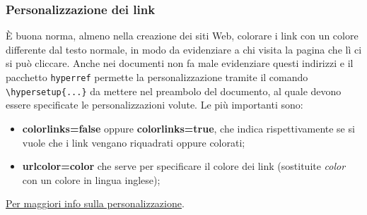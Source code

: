 \subsubsection{Personalizzazione dei link}
È buona norma, almeno nella creazione dei siti Web, colorare i link con un colore differente dal testo normale, in modo da evidenziare a chi visita la pagina che lì ci si può cliccare. Anche nei documenti non fa male evidenziare questi indirizzi e il pacchetto \verb!hyperref! permette la personalizzazione tramite il comando \verb!\hypersetup{...}! da mettere nel preambolo del documento, al quale devono essere specificate le personalizzazioni volute. Le più importanti sono:
\begin{itemize}
    \item \textbf{colorlinks=false} oppure \textbf{colorlinks=true}, che indica rispettivamente se si vuole che i link vengano riquadrati oppure colorati;
    \item \textbf{urlcolor=color} che serve per specificare il colore dei link (sostituite \textit{color} con un colore in lingua inglese);
\end{itemize}
\href{https://en.wikibooks.org/wiki/LaTeX/Hyperlinks}{Per maggiori info sulla personalizzazione}.